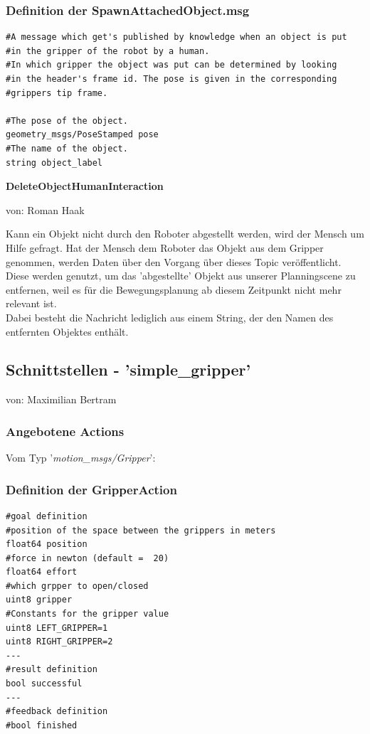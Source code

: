 \documentclass{suturo}
\makeatletter
\newcommand{\chapterauthor}[1]{%
  {\parindent0pt\vspace*{-27pt}%
  \linespread{0}\small\begin{flushright}von: #1\end{flushright}%
  \par\nobreak\vspace*{0pt}}
  \@afterheading%
}
\makeatother
\begin{document}
\subsubsection*{Definition der SpawnAttachedObject.msg}
\begin{verbatim}
#A message which get's published by knowledge when an object is put
#in the gripper of the robot by a human.
#In which gripper the object was put can be determined by looking 
#in the header's frame id. The pose is given in the corresponding
#grippers tip frame.

#The pose of the object. 
geometry_msgs/PoseStamped pose
#The name of the object.
string object_label
\end{verbatim}



\textbf{DeleteObjectHumanInteraction}
\chapterauthor{Roman Haak}

Kann ein Objekt nicht durch den Roboter abgestellt werden, wird der Mensch um Hilfe gefragt. Hat der Mensch dem Roboter das Objekt aus dem Gripper genommen, werden Daten über den Vorgang über dieses Topic veröffentlicht. Diese werden genutzt, um das 'abgestellte' Objekt aus unserer Planningscene zu entfernen, weil es für die Bewegungsplanung ab diesem Zeitpunkt nicht mehr relevant ist.\\ Dabei besteht die Nachricht lediglich aus einem String, der den Namen des entfernten Objektes enthält.




\subsection{Schnittstellen - 'simple\_gripper'}
\chapterauthor{Maximilian Bertram}
\subsubsection{Angebotene Actions}
Vom Typ '\textit{motion\_msgs/Gripper}': \\
\subsubsection*{Definition der GripperAction}
\label{interfaceSimpleGripper}
\begin{verbatim}
#goal definition
#position of the space between the grippers in meters
float64 position
#force in newton (default =  20)
float64 effort
#which grpper to open/closed
uint8 gripper
#Constants for the gripper value
uint8 LEFT_GRIPPER=1
uint8 RIGHT_GRIPPER=2
---
#result definition
bool successful
---
#feedback definition
#bool finished
\end{verbatim}
\end{document}
